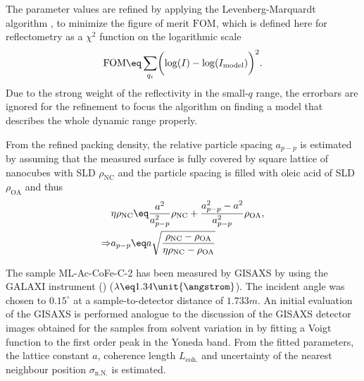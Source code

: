 \documentclass[\main/dresen_thesis.tex]{subfiles}
\begin{document}

    The parameter values are refined by applying the Levenberg-Marquardt algorithm \cite{Marquardt_1963_Analgo}, to minimize the figure of merit $\mathrm{FOM}$, which is defined here for reflectometry as a $\chi^2$ function on the logarithmic scale
    \begin{align}
      \mathrm{FOM} \eq \sum_{q_i} \biggl( \log(I) - \log(I_\mathrm{model})\biggr)^2.
    \end{align}
    Due to the strong weight of the reflectivity in the small-$q$ range, the errorbars are ignored for the refinement to focus the algorithm on finding a model that describes the whole dynamic range properly.

    From the refined packing density, the relative particle spacing $a_{p-p}$ is estimated by assuming that the measured surface is fully covered by square lattice of nanocubes with SLD $\rho_\mathrm{NC}$ and the particle spacing is filled with oleic acid of SLD $\rho_\mathrm{OA}$ and thus
    \begin{align}
      \label{eq:monolayers:characterization:particleSpacing}
      \begin{split}
        &\eta \rho_\mathrm{NC}  \eq \frac{a^2}{a_{p-p}^2} \rho_\mathrm{NC} + \frac{a_{p-p}^2 - a^2}{a_{p-p}^2} \rho_\mathrm{OA},\\
        \Rightarrow& a_{p-p} \eq a \sqrt {\frac{\rho_\mathrm{NC} - \rho_\mathrm{OA} }{\eta \rho_\mathrm{NC} - \rho_\mathrm{OA}}}
      \end{split}
    \end{align}

      The sample ML-Ac-CoFe-C-2 has been measured by GISAXS by using the GALAXI instrument () ($\lambda \eq 1.34 \unit{\angstrom}$).
      The incident angle was chosen to $0.15 ^\circ$ at a sample-to-detector distance of $1.733 \unit{m}$.
      An initial evaluation of the GISAXS is performed analogue to the discussion of the GISAXS detector images obtained for the samples from solvent variation in  by fitting a Voigt function to the first order peak in the Yoneda band.
      From the fitted parameters, the lattice constant $a$, coherence length $L_\mathrm{coh.}$ and uncertainty of the nearest neighbour position $\sigma_\mathrm{n.N.}$ is estimated.
\end{document}
